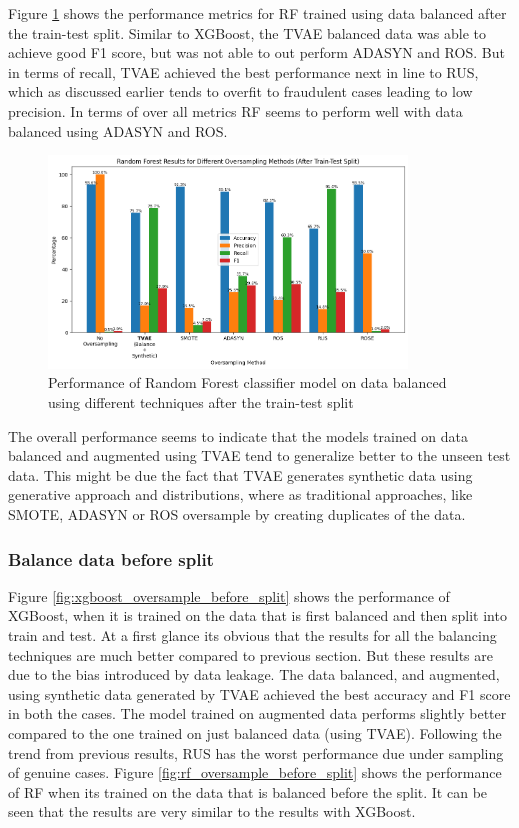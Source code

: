 \documentclass[twoside,11pt]{article}
\begin{document}
Figure \ref{fig:rf_oversample_after_split} shows the performance metrics for RF trained using data balanced after the train-test split. Similar to XGBoost, the TVAE balanced data was able to achieve good F1 score, but was not able to out perform ADASYN and ROS. But in terms of recall, TVAE achieved the best performance next in line to RUS, which as discussed earlier tends to overfit to fraudulent cases leading to low precision. In terms of over all metrics RF seems to perform well with data balanced using ADASYN and ROS.
\begin{figure}
  \centering
  \includegraphics[width=0.85\textwidth]{images/rf_oversample_after_split.png}
  \caption{Performance of Random Forest classifier model on data balanced using different techniques after the train-test split}
  \label{fig:rf_oversample_after_split}
\end{figure}
The overall performance seems to indicate that the models trained on data balanced and augmented using TVAE tend to generalize better to the unseen test data. This might be due the fact that TVAE generates synthetic data using generative approach and distributions, where as traditional approaches, like SMOTE, ADASYN or ROS oversample by creating duplicates of the data.

\subsubsection{Balance data before split} \label{sec:beforeSplit}
Figure \ref{fig:xgboost_oversample_before_split} shows the performance of XGBoost, when it is trained on the data that is first balanced and then split into train and test. At a first glance its obvious that the results for all the balancing techniques are much better compared to previous section. But these results are due to the bias introduced by data leakage. The data balanced, and augmented, using synthetic data generated by TVAE achieved the best accuracy and F1 score in both the cases. The model trained on augmented data performs slightly better compared to the one trained on just balanced data (using TVAE). Following the trend from previous results, RUS has the worst performance due under sampling of genuine cases. Figure \ref{fig:rf_oversample_before_split} shows the performance of RF when its trained on the data that is balanced before the split. It can be seen that the results are very similar to the results with XGBoost.
\end{document}
